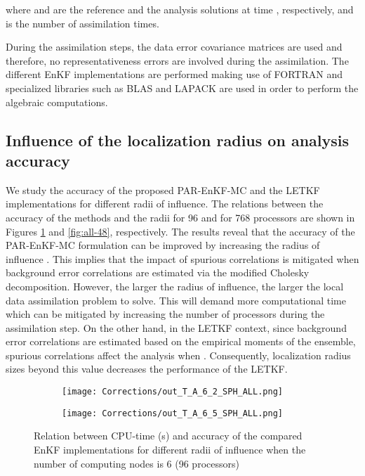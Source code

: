 \documentclass[12pt]{article}
\begin{document}
where  and  are the reference and the analysis solutions at time , respectively, and  is the number of assimilation times. 

During the assimilation steps, the data error covariance matrices  are used and therefore, no representativeness errors are involved during the assimilation. The different EnKF implementations are performed making use of FORTRAN and specialized libraries such as BLAS and LAPACK are used in order to perform the algebraic computations. 

\subsection{Influence of the  localization radius on analysis accuracy}
\label{subsec:accuracy-of-proposed-method}
We study the accuracy of the proposed PAR-EnKF-MC and the LETKF implementations for different radii of influence. The relations between the accuracy of the methods and the radii for 96 and for 768 processors are shown in Figures \ref{fig:all-16} and \ref{fig:all-48}, respectively. The results reveal that the accuracy of the PAR-EnKF-MC formulation can be improved by increasing the radius of influence . This implies that the impact of spurious correlations is mitigated when background error correlations are estimated via the modified Cholesky decomposition. However, the larger the radius of influence, the larger the local data assimilation problem to solve. This will demand more computational time which can be mitigated by increasing the number of processors during the assimilation step. On the other hand, in the LETKF context, since background error correlations are estimated based on the empirical moments of the ensemble, spurious correlations affect the analysis when . Consequently, localization radius sizes beyond this value decreases the performance of the LETKF. 
\begin{figure}[H]
\centering
\begin{subfigure}{0.5\textwidth}
\centering
\texttt{[image: Corrections/out\_T\_A\_6\_2\_SPH\_ALL.png]}
\caption{}
\end{subfigure}\begin{subfigure}{0.5\textwidth}
\centering
\texttt{[image: Corrections/out\_T\_A\_6\_5\_SPH\_ALL.png]}
\caption{}
\end{subfigure}\caption{Relation between CPU-time (s) and accuracy of the compared EnKF implementations for different radii of influence when the number of computing nodes is 6 (96 processors)}
\label{fig:all-16}
\end{figure}
\end{document}
